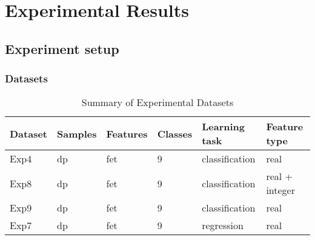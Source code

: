 \chapter{Experimental Results} \label{chap:results}

\section{Experiment setup}
\subsection{Datasets}

\begin{table}[ht]
\caption{Summary of Experimental Datasets} %
\centering %
\begin{tabular}{l l l l l l} %
\hline %
Dataset & Samples & Features & Classes & Learning task & Feature type \\ %
\hline %
Exp4 & dp & fet & 9 & classification & real\\ 
Exp8 & dp & fet & 9 & classification & real + integer\\ 
Exp9 & dp & fet & 9 & classification & real\\ 
Exp7 & dp & fet & 9 & regression     & real\\ [1ex]   %
\hline %
\end{tabular}
\label{table:expData}
\end{table}